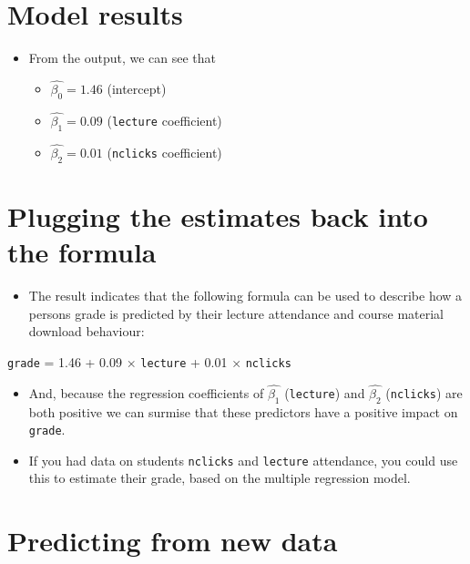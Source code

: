 \documentclass[
]{article}
\providecommand{\tightlist}{%
  \setlength{\itemsep}{0pt}\setlength{\parskip}{0pt}}
\begin{document}
\hypertarget{model-results}{%
\section{Model results}\label{model-results}}

\begin{itemize}
\tightlist
\item
  From the output, we can see that

  \begin{itemize}
  \tightlist
  \item
    \(\hat{\beta_0} = 1.46\) (intercept)
  \item
    \(\hat{\beta_1} = 0.09\) (\texttt{lecture} coefficient)
  \item
    \(\hat{\beta_2} = 0.01\) (\texttt{nclicks} coefficient)
  \end{itemize}
\end{itemize}

\hypertarget{plugging-the-estimates-back-into-the-formula}{%
\section{Plugging the estimates back into the
formula}\label{plugging-the-estimates-back-into-the-formula}}

\begin{itemize}
\tightlist
\item
  The result indicates that the following formula can be used to
  describe how a persons grade is predicted by their lecture attendance
  and course material download behaviour:
\end{itemize}

\texttt{grade} = 1.46 + 0.09 × \texttt{lecture} + 0.01 ×
\texttt{nclicks}

\begin{itemize}
\item
  And, because the regression coefficients of \(\hat{\beta_1}\)
  (\texttt{lecture}) and \(\hat{\beta_2}\) (\texttt{nclicks}) are both
  positive we can surmise that these predictors have a positive impact
  on \texttt{grade}.
\item
  If you had data on students \texttt{nclicks} and \texttt{lecture}
  attendance, you could use this to estimate their grade, based on the
  multiple regression model.
\end{itemize}

\hypertarget{predicting-from-new-data}{%
\section{Predicting from new data}\label{predicting-from-new-data}}
\end{document}
